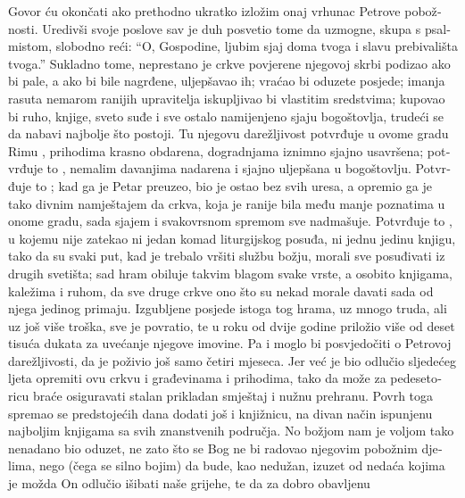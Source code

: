 \documentclass[a5paper,twoside]{article}
\begin{document}
\begin{pages}
\begin{Rightside}
\begin{croatian}
\pend
\pstart
Govor ću okončati ako prethodno ukratko izložim onaj vrhunac Petrove pobožnosti. Uredivši svoje poslove sav je duh posvetio tome da uzmogne, skupa s psalmistom, slobodno reći: ``O, Gospodine, ljubim sjaj doma tvoga i slavu prebivališta tvoga.'' Sukladno tome, neprestano je crkve povjerene njegovoj skrbi podizao ako bi pale, a ako bi bile nagrđene, uljepšavao ih; vraćao bi oduzete posjede; imanja rasuta nemarom ranijih upravitelja iskupljivao bi vlastitim sredstvima; kupovao bi ruho, knjige, sveto suđe i sve ostalo namijenjeno sjaju bogoštovlja, trudeći se da nabavi najbolje što postoji.  Tu njegovu darežljivost potvrđuje u ovome gradu Rimu , prihodima krasno obdarena, dogradnjama iznimno sjajno usavršena; potvrđuje to , nemalim davanjima nadarena i sjajno uljepšana u bogoštovlju. Potvrđuje to ; kad ga je Petar preuzeo, bio je ostao bez svih uresa, a opremio ga je tako divnim namještajem da crkva, koja je ranije bila među manje poznatima u onome gradu, sada sjajem i svakovrsnom spremom sve nadmašuje.  Potvrđuje to , u kojemu nije zatekao ni jedan komad liturgijskog posuđa, ni jednu jedinu knjigu, tako da su svaki put, kad je trebalo vršiti službu božju, morali sve posuđivati iz drugih svetišta; sad hram obiluje takvim blagom svake vrste, a osobito knjigama, kaležima i ruhom, da sve druge crkve ono što su nekad morale davati sada od njega jedinog primaju.  Izgubljene posjede istoga tog hrama, uz mnogo truda, ali uz još više troška, sve je povratio, te u roku od dvije godine priložio više od deset tisuća dukata za uvećanje njegove imovine.  Pa i  moglo bi posvjedočiti o Petrovoj darežljivosti, da je poživio još samo četiri mjeseca. Jer već je bio odlučio sljedećeg ljeta opremiti ovu crkvu i građevinama i prihodima, tako da može za pedesetoricu braće osiguravati stalan prikladan smještaj i nužnu prehranu.  Povrh toga spremao se predstojećih dana dodati još i knjižnicu, na divan način ispunjenu najboljim knjigama sa svih znanstvenih područja.  No božjom nam je voljom tako nenadano bio oduzet, ne zato što se Bog ne bi radovao njegovim pobožnim djelima, nego (čega se silno bojim) da bude, kao nedužan, izuzet od nedaća kojima je možda On odlučio išibati naše grijehe, te da za dobro obavljenu 
\end{croatian}
\end{Rightside}
\end{pages}
\end{document}
